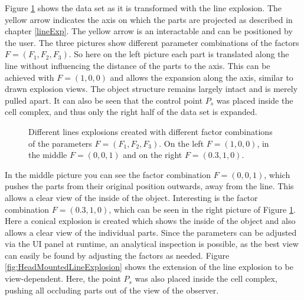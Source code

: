 Figure \ref{fig:LineExplosionPictures} shows the data set as it is transformed with the line explosion. The yellow arrow indicates the axis on which the parts are projected as described in chapter \ref{lineExp}. 
The yellow arrow is an interactable and can be positioned by the user. 
The three pictures show different parameter combinations of the factors $F=(F_1, F_2, F_3)$. So here on the left picture each part is translated along the line without influencing the distance of the parts to the axis.  
This can be achieved with $F=(1,0,0)$ and allows the expansion along the axis, similar to drawn explosion views. The object structure remains largely intact and is merely pulled apart. It can also be seen that the control point $P_s$ was placed inside the cell complex, and thus only the right half of the data set is expanded. 
\begin{figure}[t]
	\noindent{}
	\caption[]{Different lines explosions created with different factor combinations of the parameters $F=(F_1, F_2, F_3)$. On the left $F=(1,0,0)$, in the middle $F=(0, 0, 1)$ and on the right $F=(0.3, 1, 0)$.}
	\label{fig:LineExplosionPictures}
\end{figure}
In the middle picture you can see the factor combination $F=(0, 0, 1)$, which pushes the parts from their original position outwards, away from the line. 
This allows a clear view of the inside of the object. 
Interesting is the factor combination $F=(0.3, 1, 0)$, which can be seen in the right picture of Figure \ref{fig:LineExplosionPictures}. Here a conical explosion is created which shows the inside of the object and also allows a clear view of the individual parts.  
Since the parameters can be adjusted via the UI panel at runtime, an analytical inspection is possible, as the best view can easily be found by adjusting the factors as needed.   
Figure \ref{fig:HeadMountedLineExplosion} shows the extension of the line explosion to be view-dependent. Here, the point $P_s$ was also placed inside the cell complex, pushing all occluding parts out of the view of the observer. 
